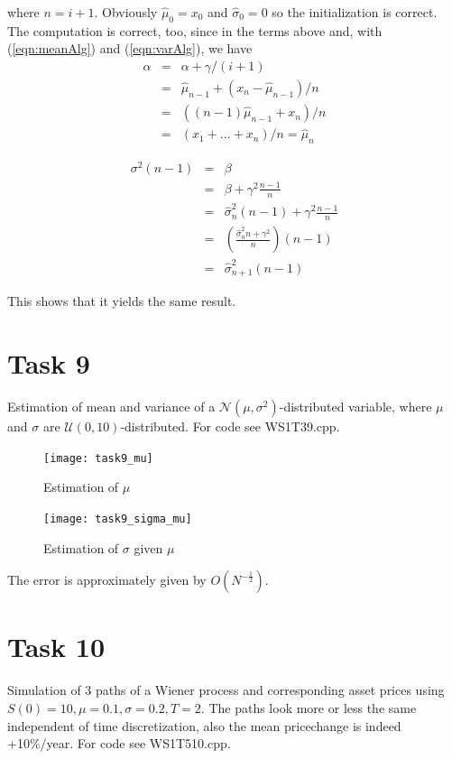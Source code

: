 \documentclass[]{article}
\begin{document}
where $n=i+1$. Obviously $\hat{\mu}_0=x_0$ and $\hat{\sigma}_0 = 0$ so the initialization is
correct. The computation is correct, too, since in the terms above and, with
(\ref{eqn:meanAlg}) and (\ref{eqn:varAlg}), we have
\begin{eqnarray*}
      \alpha & = &\alpha+\gamma/(i+1) \\
      & = &\hat{\mu}_{n-1}+(x_n-\hat{\mu}_{n-1})/n \\
      & = &((n-1)\hat{\mu}_{n-1}+x_n)/n \\
      & = &(x_1+...+x_n)/n = \hat{\mu}_{n}
\end{eqnarray*} 

\begin{eqnarray*}
      \sigma^2 \left(n-1\right) & = & \beta \\
      & = & \beta + \gamma^2\frac{n-1}{n}\\
      & = & \hat{\sigma}^{2}_n\left(n-1\right) + \gamma^2\frac{n-1}{n}\\
      & = & \left(\frac{\hat{\sigma}^{2}_n n+\gamma^2}{n}\right)\left(n-1\right)
      \\
      & = & \hat{\sigma}^{2}_{n+1}\left(n-1\right)
\end{eqnarray*} 

This shows that it yields the same result.
\clearpage
\section*{Task 9}
Estimation of mean and variance of a $\mathcal{N}(\mu,\sigma^2)$-distributed variable, where $\mu$ and $\sigma$ are $\mathcal{U}(0,10)$-distributed. For code see WS1T39.cpp.\\
\begin{figure}[!ht]
\centering
\texttt{[image: task9\_mu]}
\caption{Estimation of $\mu$}
\label{fig:Task9a}
\end{figure}

\begin{figure}[!ht]
\centering
\texttt{[image: task9\_sigma\_mu]}
\caption{Estimation of $\sigma$ given $\mu$}
\label{fig:Task9b}
\end{figure}

The error is approximately given by $O(N^{-\frac{1}{2}})$.

\newpage
\section*{Task 10} Simulation of 3 paths of a Wiener process and corresponding asset prices using $S(0)=10,\mu=0.1,\sigma=0.2,T=2$. The paths look more or less the same independent of time discretization, also the mean pricechange is indeed +10\%/year. For code see WS1T510.cpp.\\
\end{document}
